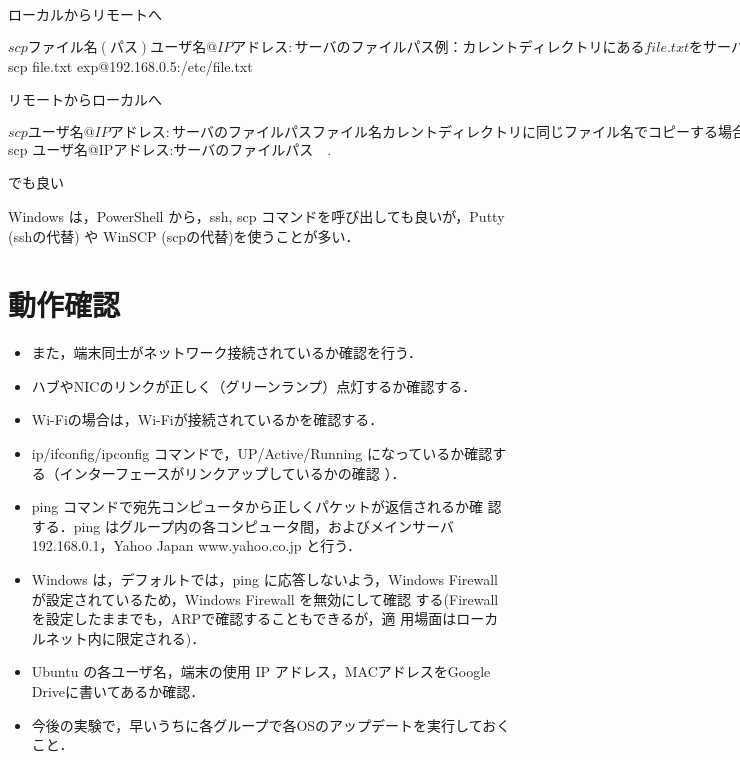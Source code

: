 \begin{cli}
ローカルからリモートへ

$ scp ファイル名(パス)  ユーザ名@IPアドレス:サーバのファイルパス

例：カレントディレクトリにある file.txt をサーバの/etc/file.txt にコピーする

$ scp file.txt  exp@192.168.0.5:/etc/file.txt

リモートからローカルへ

$ scp ユーザ名@IPアドレス:サーバのファイルパス　　ファイル名

カレントディレクトリに同じファイル名でコピーする場合は，

$ scp ユーザ名@IPアドレス:サーバのファイルパス　.

でも良い

\end{cli}

Windows は，PowerShell から，ssh, scp コマンドを呼び出しても良いが，Putty (sshの代替) や WinSCP (scpの代替)を使うことが多い．

\section{動作確認}
\begin{itemize}
 \item また，端末同士がネットワーク接続されているか確認を行う．
 \item ハブやNICのリンクが正しく（グリーンランプ）点灯するか確認する．
 \item Wi-Fiの場合は，Wi-Fiが接続されているかを確認する．
 \item ip/ifconfig/ipconfig コマンドで，UP/Active/Running になっているか確認する（インターフェースがリンクアップしているかの確認
 ）．
 \item ping コマンドで宛先コンピュータから正しくパケットが返信されるか確
       認する．ping はグループ内の各コンピュータ間，およびメインサーバ
       192.168.0.1，Yahoo Japan www.yahoo.co.jp と行う．
 \item Windows は，デフォルトでは，ping に応答しないよう，Windows
       Firewall が設定されているため，Windows Firewall を無効にして確認
       する(Firewall を設定したままでも，ARPで確認することもできるが，適
       用場面はローカルネット内に限定される)．
　\item Ubuntu の各ユーザ名，端末の使用 IP アドレス，MACアドレスをGoogle Driveに書いてあるか確認．
　\item 今後の実験で，早いうちに各グループで各OSのアップデートを実行しておくこと．
\end{itemize}

